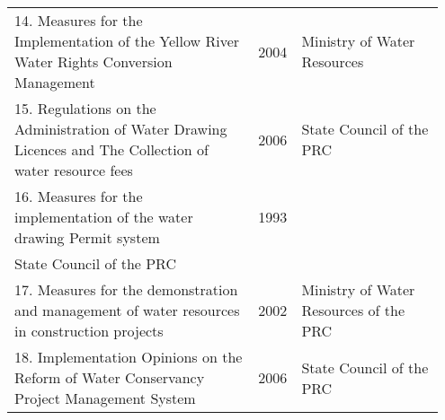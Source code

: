 \begin{table}[!h]
\begin{tabular}{p{0.6\linewidth}rp{0.35\linewidth}}
        14. Measures for the Implementation of the Yellow River Water Rights Conversion Management & 2004 & Ministry of Water Resources \\
        15. Regulations on the Administration of Water Drawing Licences and The Collection of water resource fees & 2006 & State Council of the PRC \\
        16. Measures for the implementation of the water drawing Permit system & 1993 \\ State Council of the PRC \\
        17. Measures for the demonstration and management of water resources in construction projects & 2002 & Ministry of Water Resources of the PRC \\
        18. Implementation Opinions on the Reform of Water Conservancy Project Management System & 2006 & State Council of the PRC \\
        \hline
    \end{tabular}

\end{table}
